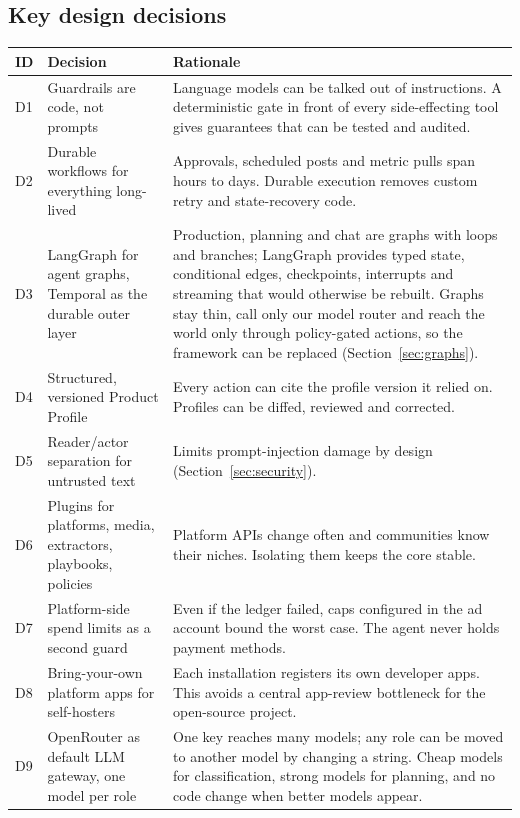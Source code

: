 \documentclass[11pt,a4paper]{article}
\begin{document}
\subsection{Key design decisions}
\begin{longtable}{@{}p{0.9cm}p{4.2cm}p{10.2cm}@{}}
\toprule
\textbf{ID} & \textbf{Decision} & \textbf{Rationale}\\
\midrule
\endhead
D1 & Guardrails are code, not prompts & Language models can be talked out of instructions. A deterministic gate in front of every side-effecting tool gives guarantees that can be tested and audited.\\
D2 & Durable workflows for everything long-lived & Approvals, scheduled posts and metric pulls span hours to days. Durable execution removes custom retry and state-recovery code.\\
D3 & LangGraph for agent graphs, Temporal as the durable outer layer & Production, planning and chat are graphs with loops and branches; LangGraph provides typed state, conditional edges, checkpoints, interrupts and streaming that would otherwise be rebuilt. Graphs stay thin, call only our model router and reach the world only through policy-gated actions, so the framework can be replaced (Section~\ref{sec:graphs}).\\
D4 & Structured, versioned Product Profile & Every action can cite the profile version it relied on. Profiles can be diffed, reviewed and corrected.\\
D5 & Reader/actor separation for untrusted text & Limits prompt-injection damage by design (Section~\ref{sec:security}).\\
D6 & Plugins for platforms, media, extractors, playbooks, policies & Platform APIs change often and communities know their niches. Isolating them keeps the core stable.\\
D7 & Platform-side spend limits as a second guard & Even if the ledger failed, caps configured in the ad account bound the worst case. The agent never holds payment methods.\\
D8 & Bring-your-own platform apps for self-hosters & Each installation registers its own developer apps. This avoids a central app-review bottleneck for the open-source project.\\
D9 & OpenRouter as default LLM gateway, one model per role & One key reaches many models; any role can be moved to another model by changing a string. Cheap models for classification, strong models for planning, and no code change when better models appear.\\

\end{longtable}
\end{document}
